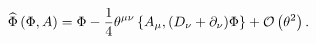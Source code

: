 \begin{equation}
\widehat{\Phi}\left(\Phi,A\right) =\Phi-\frac{1}{4}\theta^{\mu\nu}
\left\{A_\mu,(D_\nu+\partial_\nu)\Phi\right\}
 +{\cal O}\left( \theta ^{2}\right). \label{psisw}
\end{equation}

